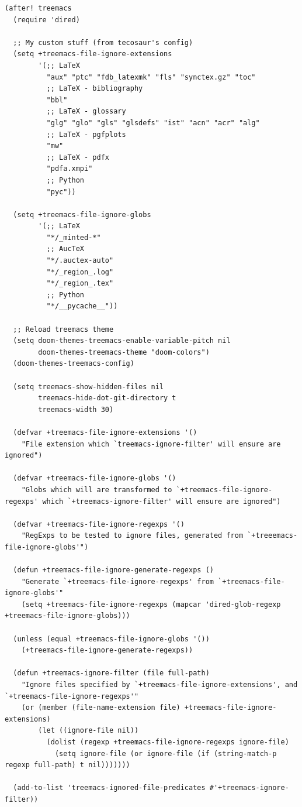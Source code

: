 \documentclass[11pt]{article}
\begin{document}
\begin{verbatim}
(after! treemacs
  (require 'dired)

  ;; My custom stuff (from tecosaur's config)
  (setq +treemacs-file-ignore-extensions
        '(;; LaTeX
          "aux" "ptc" "fdb_latexmk" "fls" "synctex.gz" "toc"
          ;; LaTeX - bibliography
          "bbl"
          ;; LaTeX - glossary
          "glg" "glo" "gls" "glsdefs" "ist" "acn" "acr" "alg"
          ;; LaTeX - pgfplots
          "mw"
          ;; LaTeX - pdfx
          "pdfa.xmpi"
          ;; Python
          "pyc"))

  (setq +treemacs-file-ignore-globs
        '(;; LaTeX
          "*/_minted-*"
          ;; AucTeX
          "*/.auctex-auto"
          "*/_region_.log"
          "*/_region_.tex"
          ;; Python
          "*/__pycache__"))

  ;; Reload treemacs theme
  (setq doom-themes-treemacs-enable-variable-pitch nil
        doom-themes-treemacs-theme "doom-colors")
  (doom-themes-treemacs-config)

  (setq treemacs-show-hidden-files nil
        treemacs-hide-dot-git-directory t
        treemacs-width 30)

  (defvar +treemacs-file-ignore-extensions '()
    "File extension which `treemacs-ignore-filter' will ensure are ignored")

  (defvar +treemacs-file-ignore-globs '()
    "Globs which will are transformed to `+treemacs-file-ignore-regexps' which `+treemacs-ignore-filter' will ensure are ignored")

  (defvar +treemacs-file-ignore-regexps '()
    "RegExps to be tested to ignore files, generated from `+treeemacs-file-ignore-globs'")

  (defun +treemacs-file-ignore-generate-regexps ()
    "Generate `+treemacs-file-ignore-regexps' from `+treemacs-file-ignore-globs'"
    (setq +treemacs-file-ignore-regexps (mapcar 'dired-glob-regexp +treemacs-file-ignore-globs)))

  (unless (equal +treemacs-file-ignore-globs '())
    (+treemacs-file-ignore-generate-regexps))

  (defun +treemacs-ignore-filter (file full-path)
    "Ignore files specified by `+treemacs-file-ignore-extensions', and `+treemacs-file-ignore-regexps'"
    (or (member (file-name-extension file) +treemacs-file-ignore-extensions)
        (let ((ignore-file nil))
          (dolist (regexp +treemacs-file-ignore-regexps ignore-file)
            (setq ignore-file (or ignore-file (if (string-match-p regexp full-path) t nil)))))))

  (add-to-list 'treemacs-ignored-file-predicates #'+treemacs-ignore-filter))
\end{verbatim}
\end{document}
